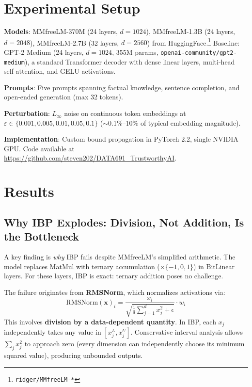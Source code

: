 \documentclass[11pt]{article}
\begin{document}
\section{Experimental Setup}

\textbf{Models}: MMfreeLM-370M (24 layers, $d{=}1024$), MMfreeLM-1.3B (24 layers, $d{=}2048$), MMfreeLM-2.7B (32 layers, $d{=}2560$) from HuggingFace.\footnote{\texttt{ridger/MMfreeLM-*}} Baseline: GPT-2 Medium (24 layers, $d{=}1024$, 355M params, \texttt{openai-community/gpt2-medium}), a standard Transformer decoder with dense linear layers, multi-head self-attention, and GELU activations.

\textbf{Prompts}: Five prompts spanning factual knowledge, sentence completion, and open-ended generation (max 32 tokens).

\textbf{Perturbation}: $L_\infty$ noise on continuous token embeddings at $\varepsilon \in \{0.001, 0.005, 0.01, 0.05, 0.1\}$ ($\sim$0.1\%--10\% of typical embedding magnitude).

\textbf{Implementation}: Custom bound propagation in PyTorch 2.2, single NVIDIA GPU. Code available at \url{https://github.com/steven202/DATA691_TrustworthyAI}.

\section{Results}

\subsection{Why IBP Explodes: Division, Not Addition, Is the Bottleneck}

\label{sec:rmsnorm}

A key finding is \emph{why} IBP fails despite MMfreeLM's simplified arithmetic. The model replaces MatMul with ternary accumulation ($\times \{-1,0,1\}$) in BitLinear layers. For these layers, IBP is exact: ternary addition poses no challenge.

The failure originates from \textbf{RMSNorm}, which normalizes activations via:
\begin{equation}
\text{RMSNorm}(\mathbf{x})_i = \frac{x_i}{\sqrt{\frac{1}{d}\sum_{j=1}^d x_j^2 + \epsilon}} \cdot w_i
\end{equation}
This involves \textbf{division by a data-dependent quantity}. In IBP, each $x_j$ independently takes any value in $[x_j^L, x_j^U]$. Conservative interval analysis allows $\sum_j x_j^2$ to approach zero (every dimension can independently choose its minimum squared value), producing unbounded outputs.
\end{document}
